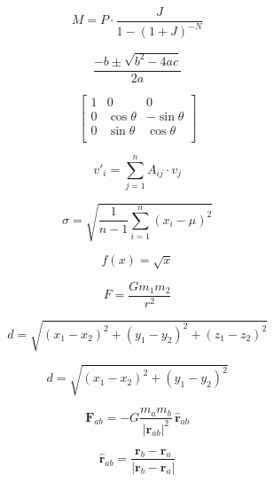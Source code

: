 \documentclass[12pt]{article}
\begin{document}
$$
M = P \cdot \frac{J}{1 - (1 + J)^{-N}}
$$

$$
\frac{-b \pm \sqrt{b^2 - 4ac}}{2a}
$$



$$
\begin{bmatrix}
1 & 0 & 0 \\
0 & \cos \theta & -\sin \theta \\
0 & \sin \theta  & \cos \theta \\
\end{bmatrix}
$$

$$
v'_i = \sum_{j = 1}^n A_{ij}\cdot v_j
$$

$$
\sigma = \sqrt{\frac{1}{n - 1}\sum_{i = 1}^n (x_i - \mu)^2}
$$

$$
f(x) = \sqrt{x}
$$

$$
F = \frac{Gm_1m_2}{r^2}
$$

$$
d = \sqrt{(x_1 - x_2)^2 + (y_1 - y_2)^2 + (z_1 -  z_2)^2}
$$

$$
d = \sqrt{(x_1 - x_2)^2+(y_1 - y_2)^2}
$$

$$
\mathbf{F}_{ab} = - G \frac{m_a m_b}{{\vert \mathbf{r}_{ab} \vert}^2} \, \mathbf{\hat{r}}_{ab}
$$

$$
\mathbf{\hat{r}}_{ab} = \frac{\mathbf{r}_b - \mathbf{r}_a}{\vert\mathbf{r}_b - \mathbf{r}_a\vert}
$$
\end{document}
